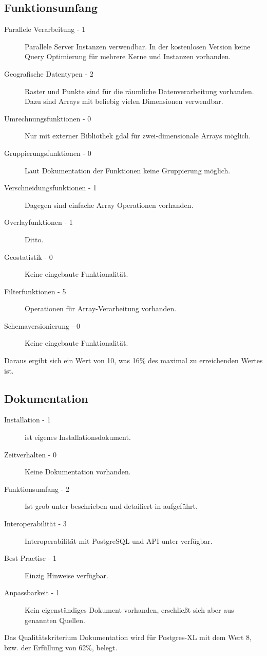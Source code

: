 \subsection{Funktionsumfang}
\begin{description}
\item[Parallele Verarbeitung - 1] Parallele Server Instanzen verwendbar. In der kostenlosen Version keine Query Optimierung für mehrere Kerne und Instanzen vorhanden. \cite{website:rasdaman-features}
\item[Geografische Datentypen - 2] Raster und Punkte sind für die räumliche Datenverarbeitung vorhanden. Dazu sind Arrays mit beliebig vielen Dimensionen verwendbar. \cite{website:rasdaman-introduction}
\item[Umrechnungsfunktionen - 0] Nur mit externer Bibliothek \Gls{gdal} für zwei-dimensionale Arrays möglich. \cite{website:rasdaman-gdal}
\item[Gruppierungsfunktionen - 0] Laut Dokumentation der Funktionen keine Gruppierung möglich. \cite{website:rasdaman-querymanual}
\item[Verschneidungsfunktionen - 1] Dagegen sind einfache Array Operationen vorhanden.
\item[Overlayfunktionen - 1] Ditto.
\item[Geostatistik - 0] Keine eingebaute Funktionalität.
\item[Filterfunktionen - 5] Operationen für Array-Verarbeitung vorhanden.
\item[Schemaversionierung - 0] Keine eingebaute Funktionalität.
\end{description}
Daraus ergibt sich ein Wert von 10, was 16\% des maximal zu erreichenden Wertes ist.

\subsection{Dokumentation}
\begin{description}
\item[Installation - 1] \cite{website:rasdaman-dokumentation} ist eigenes Installationsdokument.
\item[Zeitverhalten - 0] Keine Dokumentation vorhanden.
\item[Funktionsumfang - 2] Ist grob unter \cite{website:rasdaman-features} beschrieben und detailiert in \cite{website:rasdaman-querymanual} aufgeführt.
\item[Interoperabilität - 3] Interoperabilität mit PostgreSQL und API unter \cite{website:rasdaman-querymanual} verfügbar.
\item[Best Practise - 1] Einzig Hinweise verfügbar. \cite{website:rasdaman-installationguide}
\item[Anpassbarkeit - 1] Kein eigenständiges Dokument vorhanden, erschließt sich aber aus genannten Quellen.
\end{description}
Das Qualitätskriterium Dokumentation wird für Postgres-XL mit dem Wert 8, bzw. der Erfüllung von 62\%, belegt.

